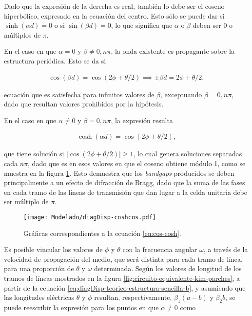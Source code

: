 Dado que la expresión de la derecha es real, también lo debe ser el coseno hiperbólico, expresado en la ecuación del centro. Esto sólo se puede dar si $\sinh(\alpha d) = 0$ o si $\sin(\beta d) = 0$, lo que significa que $\alpha$ o $\beta$ deben ser $0$ o múltiplos de $\pi$.

En el caso en que $\alpha = 0$ y $\beta \neq 0,n\pi$, la onda existente es propagante sobre la estructura periódica. Esto se da si

\begin{align}
	\label{eq:diagDisp-teorico-estructura-sencilla-b}
	\cos(\beta d) = \cos(2\phi + \theta/2) \implies \pm \beta d = 2\phi + \theta/2,
\end{align}

ecuación que es satisfecha para infinitos valores de $\beta$, exceptuando $\beta=0,n\pi$, dado que resultan valores prohibidos por la hipótesis.

En el caso en que $\alpha \neq 0$ y $\beta = 0,n\pi$, la expresión resulta

\begin{align}
\label{eq:cos-cosh}
\cosh(\alpha d) = \cos(2\phi + \theta/2),
\end{align}

que tiene solución si $|\cos(2\phi + \theta/2)| \geq 1$, lo cual genera soluciones separadas cada $n\pi$, dado que es en esos valores en que el coseno obtiene módulo 1, como se muestra en la figura \ref{fig:solucion-cos-cosh}. Esto demuestra que los \textit{bandgaps} producidos se deben principalmente a un efecto de difracción de Bragg, dado que la suma de las fases en cada tramo de las líneas de transmisión que dan lugar a la celda unitaria debe ser múltiplo de $\pi$.

\begin{figure}[h]
	\centering
	\texttt{[image: Modelado/diagDisp-coshcos.pdf]}
	\caption{Gráficas correspondientes a la ecuación \ref{eq:cos-cosh}.}
	\label{fig:solucion-cos-cosh}
\end{figure}

Es posible vincular los valores de $\phi$ y $\theta$ con la frecuencia angular $\omega$, a través de la velocidad de propagación del medio, que será distinta para cada tramo de línea, para una proporción de $\theta$ y $\omega$ determinada. Según los valores de longitud de los tramos de líneas mostrados en la figura \ref{fig:circuito-equivalente-kim-parches}, a partir de la ecuación \ref{eq:diagDisp-teorico-estructura-sencilla-b}, y asumiendo que las longitudes eléctricas $\theta$ y $\phi$ resultan, respectivamente, $\beta_1 (a-b)$ y $\beta_2 b$, se puede reescribir la expresión para los puntos en que $\alpha\neq 0$ como

